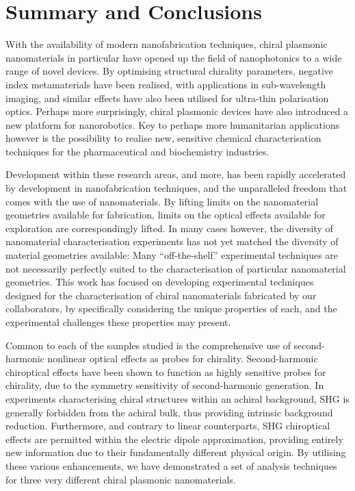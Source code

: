 \chapter{Summary and Conclusions}\label{sec:Conclusions}

With the availability of modern nanofabrication techniques, chiral plasmonic nanomaterials in particular have opened up the field of nanophotonics to a wide range of novel devices. By optimising structural chirality parameters, negative index metamaterials have been realised, with applications in sub-wavelength imaging, and similar effects have also been utilised for ultra-thin polarisation optics. Perhaps more surprisingly, chiral plasmonic devices have also introduced a new platform for nanorobotics. Key to perhaps more humanitarian applications however is the possibility to realise new, sensitive chemical characterisation techniques for the pharmaceutical and biochemistry industries. 

Development within these research areas, and more, has been rapidly accelerated by development in nanofabrication techniques, and the unparalleled freedom that comes with the use of nanomaterials. By lifting limits on the nanomaterial geometries available for fabrication, limits on the optical effects available for exploration are correspondingly lifted. In many cases however, the diversity of nanomaterial characterisation experiments has not yet matched the diversity of material geometries available: Many ``off-the-shelf'' experimental techniques are not necessarily perfectly suited to the characterisation of particular nanomaterial geometries. This work has focused on developing experimental techniques designed for the characterisation of chiral nanomaterials fabricated by our collaborators, by specifically considering the unique properties of each, and the experimental challenges these properties may present. 

Common to each of the samples studied is the comprehensive use of second-harmonic nonlinear optical effects as probes for chirality. Second-harmonic chiroptical effects have been shown to function as highly sensitive probes for chirality, due to the symmetry sensitivity of second-harmonic generation. In experiments characterising chiral structures within an achiral background, SHG is generally forbidden from the achiral bulk, thus providing intrinsic background reduction. Furthermore, and contrary to linear counterparts, SHG chiroptical effects are permitted within the electric dipole approximation, providing entirely new information due to their fundamentally different physical origin. By utilising these various enhancements, we have demonstrated a set of analysis techniques for three very different chiral plasmonic nanomaterials.

